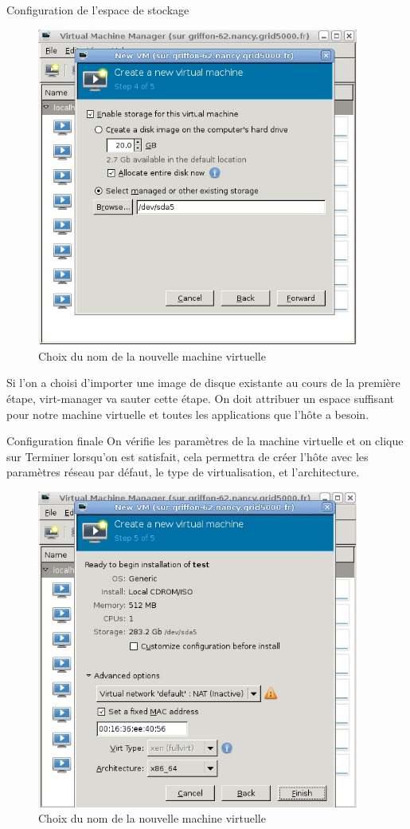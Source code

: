 Configuration de l'espace de stockage
\begin{figure}
\begin{center}
\includegraphics[width=300pt]{images/Storage.jpg}
\end{center}
\caption{Choix du nom de la nouvelle machine virtuelle}
\end{figure}


 Si l'on a choisi d'importer une image de disque existante au cours de la première étape, virt-manager va sauter cette étape.
On doit attribuer un espace suffisant pour notre machine virtuelle et toutes les applications que l'hôte a besoin.

Configuration finale
On vérifie les paramètres de la machine virtuelle et on clique sur Terminer lorsqu'on est satisfait, cela permettra de créer l'hôte avec les paramètres réseau par défaut, le type de virtualisation, et l'architecture.
\begin{figure}
\begin{center}
\includegraphics[width=300pt]{images/reseau.jpg}
\end{center}
\caption{Choix du nom de la nouvelle machine virtuelle}
\end{figure}

